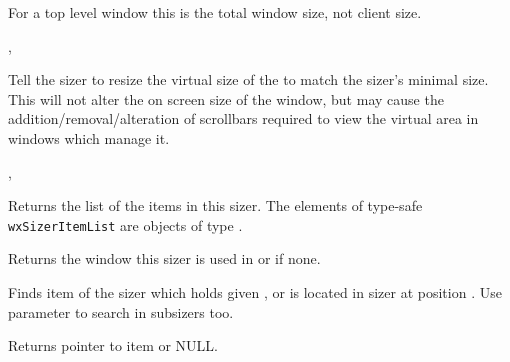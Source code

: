 For a top level window this is the total window size, not client size.


,


\label{wxsizerfitinside}


Tell the sizer to resize the virtual size of the  to match the sizer's
minimal size.  This will not alter the on screen size of the window, but may cause
the addition/removal/alteration of scrollbars required to view the virtual area in
windows which manage it.


,\rtfsp
{}


\label{wxsizergetchildren}


Returns the list of the items in this sizer. The elements of type-safe 
 \texttt{wxSizerItemList} are objects of type 
.


\label{wxsizergetcontainingwindow}


Returns the window this sizer is used in or \NULL if none.


\label{wxsizergetitem}




Finds item of the sizer which holds given ,  or is located
in sizer at position .
Use parameter  to search in subsizers too.

Returns pointer to item or NULL.


\label{wxsizergetsize}

